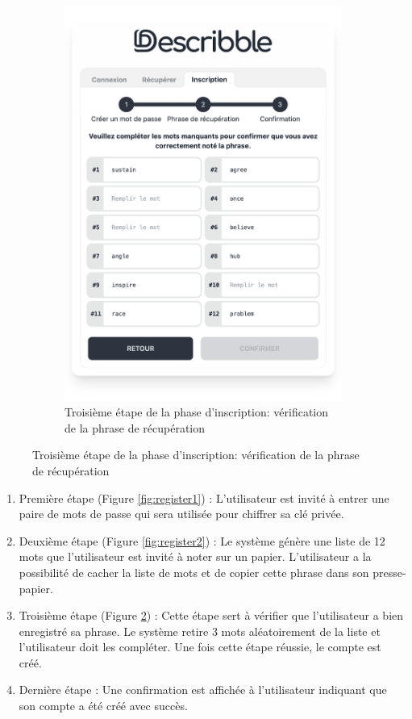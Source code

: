 \begin{figure}[H]
\begin{subfigure}[t]{0.45\textwidth}
        \includegraphics[width=\textwidth]{assets/figures/describble-register-3.png}
        \caption{Troisième étape de la phase d'inscription: vérification de la phrase de récupération\label{fig:register3}}
    \end{subfigure}
\end{figure}

\begin{enumerate}
    \item Première étape (Figure \ref{fig:register1}) : L'utilisateur est invité à entrer une paire de mots de passe qui sera utilisée pour chiffrer sa clé privée.
    \item Deuxième étape (Figure \ref{fig:register2}) : Le système génère une liste de 12 mots que l'utilisateur est invité à noter sur un papier. L'utilisateur a la possibilité de cacher la liste de mots et de copier cette phrase dans son presse-papier.
    \item Troisième étape (Figure \ref{fig:register3}) : Cette étape sert à vérifier que l'utilisateur a bien enregistré sa phrase. Le système retire 3 mots aléatoirement de la liste et l'utilisateur doit les compléter. Une fois cette étape réussie, le compte est créé.
    \item Dernière étape : Une confirmation est affichée à l'utilisateur indiquant que son compte a été créé avec succès.
\end{enumerate}

